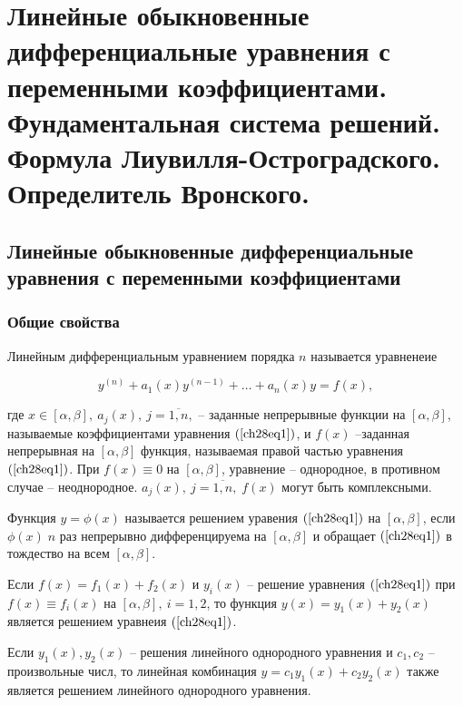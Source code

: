 \chapter{Линейные обыкновенные дифференциальные уравнения с переменными коэффициентами. Фундаментальная система решений. Формула Лиувилля-Остроградского. Определитель Вронского.}

\section{Линейные обыкновенные дифференциальные уравнения с переменными коэффициентами}

\subsection{Общие свойства}

Линейным дифференциальным уравнением порядка $n$ называется уравненеие 

\begin{equation} \label{ch28eq1}
y^{(n)} + a_1(x)y^{(n - 1)} + \ldots + a_n(x)y = f(x),
\end{equation}

где $x \in [\alpha, \beta], \: a_j(x), \: j = \overline{1,n},$ -- заданные непрерывные функции на $[\alpha, \beta]$, называемые коэффициентами уравнения $(\ref{ch28eq1})$, и $f(x)$ --заданная непрерывная на $[\alpha, \beta]$ функция, называемая правой частью уравнения $(\ref{ch28eq1})$. При $f(x) \equiv 0$ на $[\alpha, \beta]$, уравнение -- однородное, в противном случае -- неоднородное. $a_j(x), \: j = \overline{1,n}, \; f(x)$ могут быть комплексными.

Функция $y = \phi(x)$ называется решением уравения $(\ref{ch28eq1})$ на $[\alpha, \beta]$, если $\phi(x) \; n$ раз непрерывно дифференцируема на $[\alpha, \beta]$ и обращает $(\ref{ch28eq1})$ в тождество на всем $[\alpha, \beta]$.

\begin{lemm}
Если $f(x) = f_1(x) + f_2(x)$ и $y_i(x)$ -- решение уравнения $(\ref{ch28eq1})$ при $f(x) \equiv f_i(x)$ на $[\alpha, \beta], \: i = 1,2$, то функция $y(x) = y_1(x) + y_2(x)$ является решением уравнеия $(\ref{ch28eq1})$.
\end{lemm}  

\begin{cons}
Если $y_1(x), y_2(x)$ -- решения линейного однородного уравнения и $c_1, c_2$ -- произвольные числ, то линейная комбинация $y = c_1y_1(x) + c_2y_2(x)$ также является решением линейного однородного уравнения.
\end{cons}

